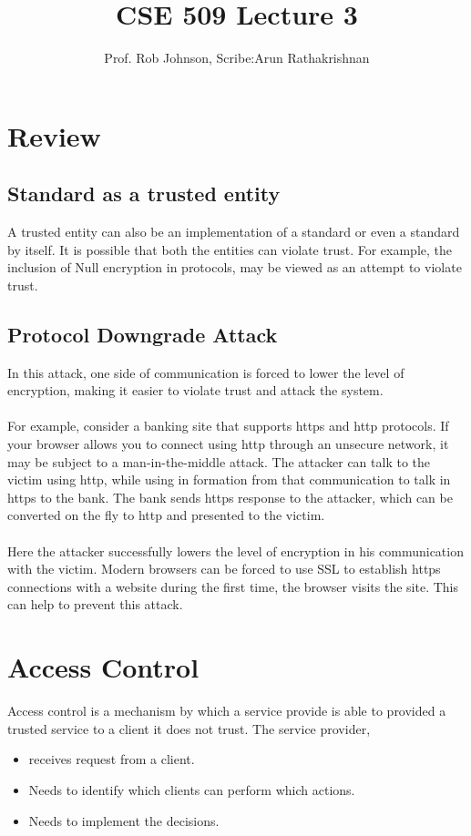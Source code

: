 \documentclass[11pt]{article} %
\title{CSE 509 Lecture 3}
\author{Prof. Rob Johnson, Scribe:Arun Rathakrishnan}
\begin{document}
\maketitle

\section{Review}
\subsection{Standard as a trusted entity}
A trusted entity can also be an implementation of a standard or even a standard by itself.
It is possible that both the entities can violate trust. For example, the inclusion of
Null encryption in protocols, may be viewed as an attempt to violate trust.

\subsection{Protocol Downgrade Attack}
In this attack, one side of communication is forced to lower the level of encryption,
making it easier to violate trust and attack the system. \\
\\
For example, consider a banking site that supports https and http protocols. If your 
browser allows you to connect using http through an unsecure network, it may be subject to
a man-in-the-middle attack. The attacker can talk to the victim using http, while using in
formation from that communication to talk in https to the bank. The bank sends https
response to the attacker, which can be converted on the fly to http and presented to the
victim.\\
\\
Here the attacker successfully lowers the level of encryption in his communication with
the victim. Modern browsers can be forced to use SSL to establish https connections with
a website during the first time, the browser visits the site. This can help to prevent
this attack.

\section{Access Control}
Access control is a mechanism by which a service provide is able to provided a trusted 
service to a client it does not trust. The service provider,

\begin{itemize} \itemsep -2pt  %
\item receives request from a client.
\item Needs to identify which clients can perform which actions.
\item Needs to implement the decisions.
\end{itemize}
\end{document}
